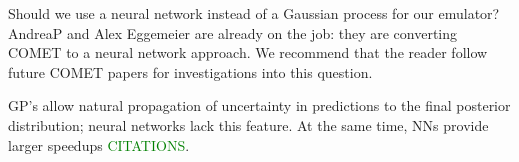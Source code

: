 Should we use a neural network instead of a Gaussian process for our emulator? AndreaP and Alex Eggemeier are already on the job: they are converting COMET to a neural network approach. We recommend that the reader follow future COMET papers for investigations into this question.

GP's allow natural propagation of
uncertainty in predictions to the final posterior distribution; neural
networks lack this feature. At the same time, NNs provide larger speedups \textcolor{green}{CITATIONS}.
